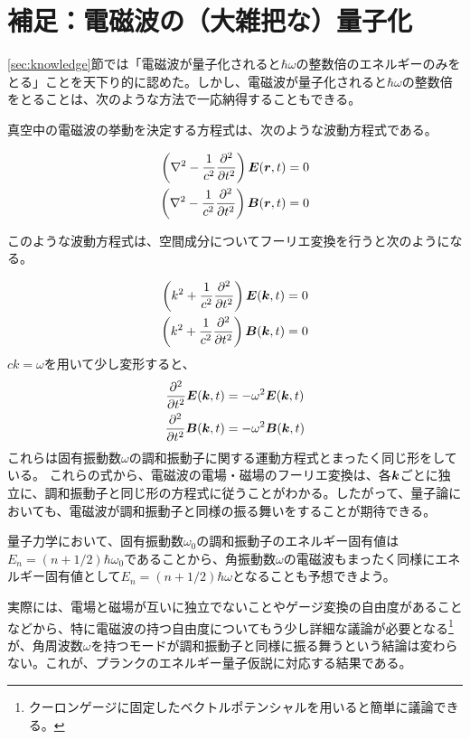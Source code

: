 \documentclass[uplatex,dvipdfmx]{jsarticle}
\begin{document}
\section{補足：電磁波の（大雑把な）量子化}
\ref{sec:knowledge}節では「電磁波が量子化されると$\hbar \omega$の整数倍のエネルギーのみをとる」ことを天下り的に認めた。しかし、電磁波が量子化されると$\hbar \omega$の整数倍をとることは、次のような方法で一応納得することもできる。

真空中の電磁波の挙動を決定する方程式は、次のような波動方程式である。

\begin{align}
    \left(\nabla^2 - \frac{1}{c^2}\pdv[2]{}{t}\right) \vb*{E}(\vb*{r},t) &= 0 \\
    \left(\nabla^2 - \frac{1}{c^2}\pdv[2]{}{t}\right) \vb*{B}(\vb*{r},t) &= 0    
\end{align}

このような波動方程式は、空間成分についてフーリエ変換を行うと次のようになる。

\begin{align}
    \left(k^2 + \frac{1}{c^2}\pdv[2]{}{t}\right) \vb*{E}(\vb*{k},t) &= 0 \\
    \left(k^2 + \frac{1}{c^2}\pdv[2]{}{t}\right) \vb*{B}(\vb*{k},t) &= 0
\end{align}
$ck = \omega$を用いて少し変形すると、
\begin{align}
    \pdv[2]{}{t} \vb*{E}(\vb*{k},t) &= -\omega^2 \vb*{E}(\vb*{k},t) \\
    \pdv[2]{}{t} \vb*{B}(\vb*{k},t) &= -\omega^2 \vb*{B}(\vb*{k},t) \\
\end{align}
これらは固有振動数$\omega$の調和振動子に関する運動方程式とまったく同じ形をしている。
これらの式から、電磁波の電場・磁場のフーリエ変換は、各$\vb*{k}$ごとに独立に、調和振動子と同じ形の方程式に従うことがわかる。したがって、量子論においても、電磁波が調和振動子と同様の振る舞いをすることが期待できる。

量子力学において、固有振動数$\omega_0$の調和振動子のエネルギー固有値は$E_n = (n+1/2)\hbar\omega_0$であることから、角振動数$\omega$の電磁波もまったく同様にエネルギー固有値として$E_n = (n+1/2)\hbar\omega$となることも予想できよう。

\vspace{0.5cm}

実際には、電場と磁場が互いに独立でないことやゲージ変換の自由度があることなどから、特に電磁波の持つ自由度についてもう少し詳細な議論が必要となる\footnote{クーロンゲージに固定したベクトルポテンシャルを用いると簡単に議論できる。}が、角周波数$\omega$を持つモードが調和振動子と同様に振る舞うという結論は変わらない。これが、プランクのエネルギー量子仮説に対応する結果である。
\end{document}
